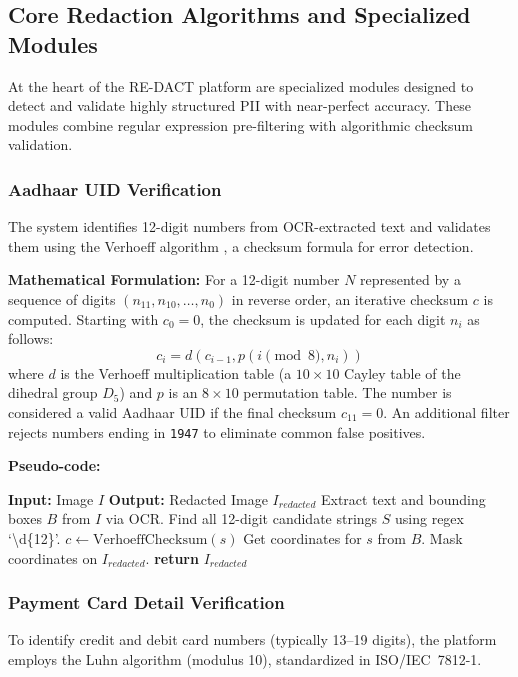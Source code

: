 \documentclass[conference]{IEEEtran}
\begin{document}
\subsection{Core Redaction Algorithms and Specialized Modules}
At the heart of the RE-DACT platform are specialized modules designed to detect and validate highly structured PII with near-perfect accuracy. These modules combine regular expression pre-filtering with algorithmic checksum validation.

\subsubsection{Aadhaar UID Verification}
The system identifies 12-digit numbers from OCR-extracted text and validates them using the Verhoeff algorithm \cite{b17}, a checksum formula for error detection.

\textbf{Mathematical Formulation:} For a 12-digit number $N$ represented by a sequence of digits $(n_{11}, n_{10}, \dots, n_0)$ in reverse order, an iterative checksum $c$ is computed. Starting with $c_0 = 0$, the checksum is updated for each digit $n_i$ as follows:
\begin{equation}
c_{i} = d(c_{i-1}, p(i \pmod 8, n_i))
\end{equation}
where $d$ is the Verhoeff multiplication table (a $10 \times 10$ Cayley table of the dihedral group $D_5$) and $p$ is an $8 \times 10$ permutation table. The number is considered a valid Aadhaar UID if the final checksum $c_{11} = 0$. An additional filter rejects numbers ending in \texttt{1947} to eliminate common false positives.

\textbf{Pseudo-code:}
\begin{algorithmic}[1]
\STATE \textbf{Input:} Image $I$
\STATE \textbf{Output:} Redacted Image $I_{redacted}$
\STATE Extract text and bounding boxes $B$ from $I$ via OCR.
\STATE Find all 12-digit candidate strings $S$ using regex `\textbackslash d\{12\}'.
    \STATE $c \leftarrow \text{VerhoeffChecksum}(s)$
        \STATE Get coordinates for $s$ from $B$.
        \STATE Mask coordinates on $I_{redacted}$.
    \ENDIF
\ENDFOR
\STATE \textbf{return} $I_{redacted}$
\end{algorithmic}

\subsubsection{Payment Card Detail Verification}
To identify credit and debit card numbers (typically 13--19 digits), the platform employs the Luhn algorithm \cite{b18} (modulus 10), standardized in ISO/IEC~7812-1.
\end{document}
